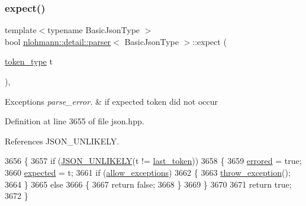 \subsubsection{\texorpdfstring{expect()}{expect()}}
{\footnotesize\ttfamily template$<$typename Basic\+Json\+Type $>$ \\
bool \hyperlink{classnlohmann_1_1detail_1_1parser}{nlohmann\+::detail\+::parser}$<$ Basic\+Json\+Type $>$\+::expect (\begin{DoxyParamCaption}\item[{\hyperlink{classnlohmann_1_1detail_1_1parser_a21d247111b332785b7acf3f8e487d117}{token\+\_\+type}}]{t }\end{DoxyParamCaption})\hspace{0.3cm}{\ttfamily [inline]}, {\ttfamily [private]}}


\begin{DoxyExceptions}{Exceptions}
{\em parse\+\_\+error.} & if expected token did not occur \\
\hline
\end{DoxyExceptions}


Definition at line 3655 of file json.\+hpp.



References J\+S\+O\+N\+\_\+\+U\+N\+L\+I\+K\+E\+LY.


\begin{DoxyCode}
3656     \{
3657         \textcolor{keywordflow}{if} (\hyperlink{json_8hpp_ab77582407c64944e7db1ea95ab520253}{JSON\_UNLIKELY}(t != \hyperlink{classnlohmann_1_1detail_1_1parser_a932e49f6f4d291557846744319245994}{last\_token}))
3658         \{
3659             \hyperlink{classnlohmann_1_1detail_1_1parser_af6a116454a868ebb6628c6137c3dd77d}{errored} = \textcolor{keyword}{true};
3660             \hyperlink{classnlohmann_1_1detail_1_1parser_ad055620d886819b26dabc1dfb80c7fb7}{expected} = t;
3661             \textcolor{keywordflow}{if} (\hyperlink{classnlohmann_1_1detail_1_1parser_a3de1ea054cfa606e79fa07741f081b5f}{allow\_exceptions})
3662             \{
3663                 \hyperlink{classnlohmann_1_1detail_1_1parser_a9ff5745f2ba313e795d6568bae6dddb8}{throw\_exception}();
3664             \}
3665             \textcolor{keywordflow}{else}
3666             \{
3667                 \textcolor{keywordflow}{return} \textcolor{keyword}{false};
3668             \}
3669         \}
3670 
3671         \textcolor{keywordflow}{return} \textcolor{keyword}{true};
3672     \}
\end{DoxyCode}
\mbox{\label{classnlohmann_1_1detail_1_1parser_a33f3859d0dd402445b5859070fd24bab}} 
